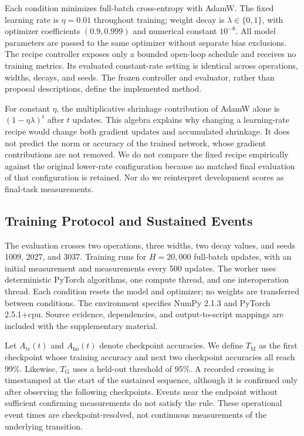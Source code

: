 \documentclass{article}
\newcommand{\TM}{T_{\mathrm{M}}}
\newcommand{\TG}{T_{\mathrm{G}}}
\begin{document}
Each condition minimizes full-batch cross-entropy with AdamW. The fixed learning rate is $\eta=0.01$ throughout training; weight decay is $\lambda\in\{0,1\}$, with optimizer coefficients $(0.9,0.999)$ and numerical constant $10^{-8}$. All model parameters are passed to the same optimizer without separate bias exclusions. The recipe controller exposes only a bounded open-loop schedule and receives no training metrics. Its evaluated constant-rate setting is identical across operations, widths, decays, and seeds. The frozen controller and evaluator, rather than proposal descriptions, define the implemented method.

For constant $\eta$, the multiplicative shrinkage contribution of AdamW alone is $(1-\eta\lambda)^t$ after $t$ updates. This algebra explains why changing a learning-rate recipe would change both gradient updates and accumulated shrinkage. It does not predict the norm or accuracy of the trained network, whose gradient contributions are not removed. We do not compare the fixed recipe empirically against the original lower-rate configuration because no matched final evaluation of that configuration is retained. Nor do we reinterpret development scores as final-task measurements.

\subsection{Training Protocol and Sustained Events}

The evaluation crosses two operations, three widths, two decay values, and seeds 1009, 2027, and 3037. Training runs for $H=20,000$ full-batch updates, with an initial measurement and measurements every 500 updates. The worker uses deterministic PyTorch algorithms, one compute thread, and one interoperation thread. Each condition resets the model and optimizer; no weights are transferred between conditions. The environment specifies NumPy 2.1.3 and PyTorch 2.5.1+cpu. Source evidence, dependencies, and output-to-script mappings are included with the supplementary material.

Let $A_{\mathrm{tr}}(t)$ and $A_{\mathrm{ho}}(t)$ denote checkpoint accuracies. We define $\TM$ as the first checkpoint whose training accuracy and next two checkpoint accuracies all reach 99\%. Likewise, $\TG$ uses a held-out threshold of 95\%. A recorded crossing is timestamped at the start of the sustained sequence, although it is confirmed only after observing the following checkpoints. Events near the endpoint without sufficient confirming measurements do not satisfy the rule. These operational event times are checkpoint-resolved, not continuous measurements of the underlying transition.
\end{document}
